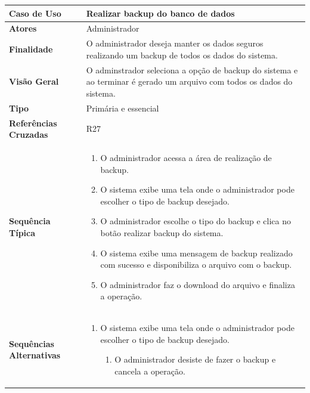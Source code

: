 \documentclass[a4paper,11pt]{article}
\begin{document}
\begin{table}[H]
		\begin{tabularx}{\textwidth}{|l|X|}
		\hline
			\textbf{Caso de Uso} &  Realizar backup do banco de dados \\ \hline
			\textbf{Atores} &  Administrador  \\ \hline
			\textbf{Finalidade} &  O administrador deseja manter os dados seguros realizando um backup de todos os dados do sistema. \\ \hline
			\textbf{Visão Geral} & O adminstrador seleciona a opção de backup do sistema e ao terminar é gerado um arquivo com todos os dados do sistema. \\ \hline
			\textbf{Tipo} & Primária e essencial \\ \hline
			\textbf{Referências Cruzadas} &  R27 \\ \hline
			\textbf{Sequência Típica} & 
			\begin{enumerate}
			\item O administrador acessa a área de realização de backup.
			\item O sistema exibe uma tela onde o administrador pode escolher o tipo de backup desejado.	
			\item O administrador escolhe o tipo do backup e clica no botão realizar backup do sistema.
			\item O sistema exibe uma mensagem de backup realizado com sucesso e disponibiliza o arquivo com o backup.
			\item O administrador faz o download do arquivo e finaliza a operação.
			
			\end{enumerate} \\ \hline
			\textbf{Sequências Alternativas} & 
			\begin{enumerate}
			\item O sistema exibe uma tela onde o administrador pode escolher o tipo de backup desejado.
			\begin{enumerate}
			\item O administrador desiste de fazer o backup e cancela a operação.
			\end{enumerate}
			\end{enumerate} \\ \hline
		\end{tabularx}
\end{table}
\end{document}
